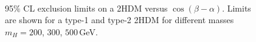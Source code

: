 \begin{figure}[H]
{}
\\

\caption{95$\%$ CL exclusion limits on a 2HDM versus $\cos(\beta-\alpha)$. Limits are shown for a type-1 and type-2 2HDM for different masses $m_{H}=200$, $300$, $500\,$GeV.}
    \label{fig:2HDMa}
\end{figure}

